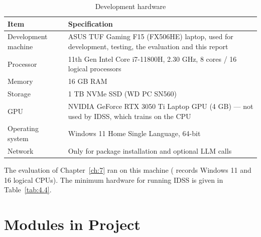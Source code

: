 \begin{table}[H]
\centering
\linespread{1}\small
\setlength{\tabcolsep}{4pt}
\caption{Development hardware}\label{tab:5.2}
\begin{tabular}{|>{\raggedright\arraybackslash\hspace{0pt}}p{}|>{\raggedright\arraybackslash\hspace{0pt}}p{}|}
\hline
\rowcolor{tableheader}\textbf{Item} & \textbf{Specification} \\
\hline
Development machine & ASUS TUF Gaming F15 (FX506HE) laptop, used for development, testing, the evaluation and this report \\ \hline
Processor & 11th Gen Intel Core i7-11800H, 2.30 GHz, 8 cores / 16 logical processors \\ \hline
Memory & 16 GB RAM \\ \hline
Storage & 1 TB NVMe SSD (WD PC SN560) \\ \hline
GPU & NVIDIA GeForce RTX 3050 Ti Laptop GPU (4 GB) --- not used by IDSS, which trains on the CPU \\ \hline
Operating system & Windows 11 Home Single Language, 64-bit \\ \hline
Network & Only for package installation and optional LLM calls \\ \hline
\end{tabular}
\end{table}

The evaluation of Chapter~\ref{ch:7} ran on this machine ( records Windows 11 and 16 logical CPUs). The minimum hardware for running IDSS is given in Table~\ref{tab:4.4}.

\FloatBarrier
\section{Modules in Project}\label{sec:5.3}

